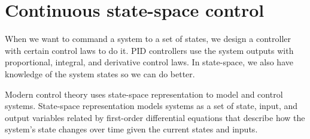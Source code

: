
\chapter{Continuous state-space control}

When we want to command a \gls{system} to a set of \glspl{state}, we design a
controller with certain \glspl{control law} to do it. PID controllers use the
system \glspl{output} with proportional, integral, and derivative
\glspl{control law}. In state-space, we also have knowledge of the system
\glspl{state} so we can do better.

Modern control theory uses state-space representation to model and control
systems. State-space representation models \glspl{system} as a set of
\gls{state}, \gls{input}, and \gls{output} variables related by first-order
differential equations that describe how the \gls{system}'s \gls{state} changes
over time given the current \glspl{state} and \glspl{input}.

\renewcommand*{\chapterpath}{\partpath/continuous-state-space-control}









